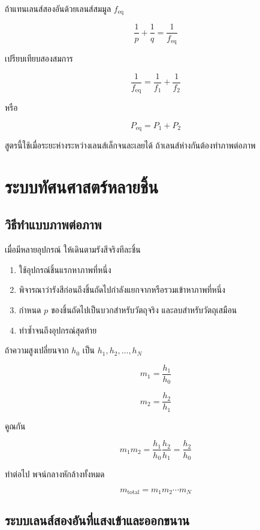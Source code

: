 ถ้าแทนเลนส์สองอันด้วยเลนส์สมมูล $f_{\text{eq}}$

\[
\frac{1}{p}+\frac{1}{q}=\frac{1}{f_{\text{eq}}}
\]

เปรียบเทียบสองสมการ

\begin{tcolorbox}[title={เลนส์บางชิดกัน}]
\[
\boxed{
\frac{1}{f_{\text{eq}}}
=
\frac{1}{f_1}+\frac{1}{f_2}}
\]

หรือ

\[
\boxed{P_{\text{eq}}=P_1+P_2}
\]
\end{tcolorbox}

สูตรนี้ใช้เมื่อระยะห่างระหว่างเลนส์เล็กจนละเลยได้ ถ้าเลนส์ห่างกันต้องทำภาพต่อภาพ

\section{ระบบทัศนศาสตร์หลายชิ้น}

\subsection{วิธีทำแบบภาพต่อภาพ}

เมื่อมีหลายอุปกรณ์ ให้เดินตามรังสีจริงทีละชิ้น

\begin{enumerate}
    \item ใช้อุปกรณ์ชิ้นแรกหาภาพที่หนึ่ง
    \item พิจารณาว่ารังสีก่อนถึงชิ้นถัดไปกำลังแยกจากหรือรวมเข้าหาภาพที่หนึ่ง
    \item กำหนด $p$ ของชิ้นถัดไปเป็นบวกสำหรับวัตถุจริง และลบสำหรับวัตถุเสมือน
    \item ทำซ้ำจนถึงอุปกรณ์สุดท้าย
\end{enumerate}

ถ้าความสูงเปลี่ยนจาก $h_0$ เป็น $h_1,h_2,\ldots,h_N$

\[
m_1=\frac{h_1}{h_0}
\]

\[
m_2=\frac{h_2}{h_1}
\]

คูณกัน

\[
m_1m_2
=
\frac{h_1}{h_0}\frac{h_2}{h_1}
=
\frac{h_2}{h_0}
\]

ทำต่อไป พจน์กลางหักล้างทั้งหมด

\begin{tcolorbox}[title={กำลังขยายรวม}]
\[
\boxed{m_{\text{total}}=m_1m_2\cdots m_N}
\]
\end{tcolorbox}

\subsection{ระบบเลนส์สองอันที่แสงเข้าและออกขนาน}

